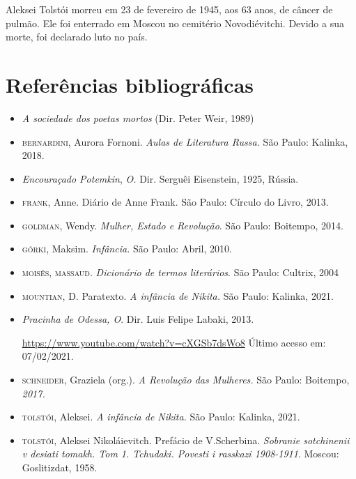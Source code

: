 \documentclass{article}
\begin{document}
Aleksei Tolstói morreu em 23 de fevereiro de 1945, aos 63 anos, de
câncer de pulmão. Ele foi enterrado em Moscou no cemitério
Novodiévitchi. Devido a sua morte, foi declarado luto no país.

\section{Referências bibliográficas}

\begin{itemize}
\item[]\emph{A sociedade dos poetas mortos} (Dir. Peter Weir, 1989)

\item[]\textsc{bernardini}, Aurora Fornoni. \emph{Aulas de Literatura Russa.} São Paulo:
Kalinka, 2018.

\item[]\emph{Encouraçado Potemkin}, \emph{O.} Dir. Serguêi Eisenstein, 1925,
Rússia.

\item[]\textsc{frank}, Anne. Diário de Anne Frank. São Paulo: Círculo do Livro, 2013.

\item[]\textsc{goldman}, Wendy. \emph{Mulher, Estado e Revolução}. São Paulo: Boitempo,
2014.

\item[]\textsc{górki}, Maksim. \emph{Infância.} São Paulo: Abril, 2010.

\item[]\textsc{moisés, massaud}. \emph{Dicionário de termos literários}. São Paulo:
Cultrix, 2004

\item[]\textsc{mountian}, D. Paratexto. \emph{A infância de Nikita.} São Paulo: Kalinka,
2021.

\item[]\emph{Pracinha de Odessa, O}. Dir. Luis Felipe Labaki, 2013.

\url{https://www.youtube.com/watch?v=cXGSb7dsWo8} Último acesso em: 07/02/2021.

\item[]\textsc{schneider}, Graziela (org.). \emph{A Revolução das Mulheres.} São Paulo:
Boitempo, \emph{2017.}

\item[]\textsc{tolstói}, Aleksei. \emph{A infância de Nikita.} São Paulo: Kalinka, 2021.

\item[]\textsc{tolstói}, Aleksei Nikoláievitch. Prefácio de V.Scherbina. \emph{Sobranie
sotchinenii v desiati tomakh. Tom 1. Tchudaki. Povesti i rasskazi
1908-1911}. Moscou: Goslitizdat, 1958.


\end{itemize}
\end{document}
